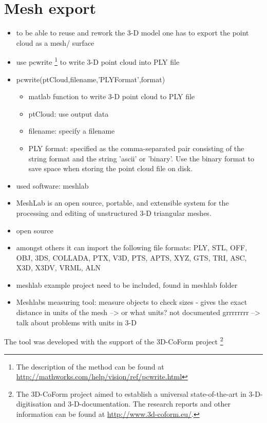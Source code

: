 \section{Mesh export}
	
\begin{itemize}
\item to be able to reuse and rework the 3-D model one has to export the point cloud as a mesh/ surface
\item use pcwrite \footnote{The description of the method can be found at \url{http://mathworks.com/help/vision/ref/pcwrite.html}} to write 3-D point cloud into PLY file
\item pcwrite(ptCloud,filename,'PLYFormat',format) 
	\begin{itemize}
	\item matlab function to write 3-D point cloud to PLY file
	\item ptCloud: use output data
	\item filename: specify a filename
	\item PLY format: specified as the comma-separated pair consisting of the string format and the string 'ascii' or 'binary'. Use the binary format to save space when storing the point cloud file on disk.
	\end{itemize}


\item used software: meshlab \cite{Meshlab.2016}
\item MeshLab is an open source, portable, and extensible system for the processing and editing of unstructured 3-D triangular meshes.
\item open source
\item amongst others it can import the following file formats: PLY, STL, OFF, OBJ, 3DS, COLLADA, PTX, V3D, PTS, APTS, XYZ, GTS, TRI, ASC, X3D, X3DV, VRML, ALN
\item meshlab example project need to be included, found in meshlab folder
\item Meshlabs measuring tool: measure objects to check sizes - gives the exact distance in units of the mesh --> or what units? not documented grrrrrrrr --> talk about problems with units in 3-D
\end{itemize}


The tool was developed with the support of the 3D-CoForm project \footnote{The 3D-CoForm project aimed to establish a universal state-of-the-art in 3-D-digitisation and 3-D-documentation. The research reports and other information can be found at \url{http://www.3d-coform.eu/}.}

